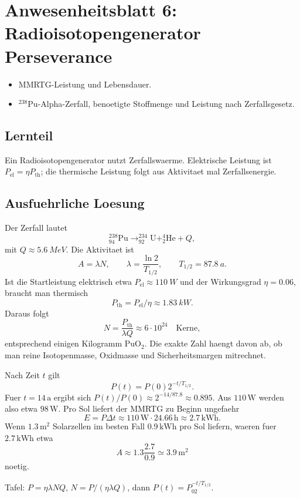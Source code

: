 \documentclass[11pt,a4paper]{scrartcl}
\newcommand{\nuclide}[3]{^{#1}_{#2}\mathrm{#3}}
\begin{document}
\section{Anwesenheitsblatt 6: Radioisotopengenerator Perseverance}
\begin{taskbox}\begin{itemize}\item MMRTG-Leistung und Lebensdauer.\item \(^{238}\mathrm{Pu}\)-Alpha-Zerfall, benoetigte Stoffmenge und Leistung nach Zerfallsgesetz.\end{itemize}\end{taskbox}
\subsection{Lernteil}\begin{learningbox}Ein Radioisotopengenerator nutzt Zerfallswaerme. Elektrische Leistung ist \(P_{\mathrm{el}}=\eta P_{\mathrm{th}}\); die thermische Leistung folgt aus Aktivitaet mal Zerfallsenergie.\end{learningbox}
\subsection{Ausfuehrliche Loesung}
\begin{calculationbox}[title={Zerfall und Leistung}]
Der Zerfall lautet
\[\nuclide{238}{94}{Pu}\to\nuclide{234}{92}{U}+\nuclide{4}{2}{He}+Q,\]
mit \(Q\approx\SI{5.6}{MeV}\). Die Aktivitaet ist
\[A=\lambda N,\qquad \lambda=\frac{\ln2}{T_{1/2}},\qquad T_{1/2}=\SI{87.8}{a}.\]
Ist die Startleistung elektrisch etwa \(P_{\mathrm{el}}\approx\SI{110}{W}\) und der Wirkungsgrad \(\eta=0.06\), braucht man thermisch
\[P_{\mathrm{th}}=P_{\mathrm{el}}/\eta\approx\SI{1.83}{kW}.\]
Daraus folgt
\[N=\frac{P_{\mathrm{th}}}{\lambda Q}\approx6\cdot10^{24}\quad\text{Kerne},\]
entsprechend einigen Kilogramm \(\mathrm{PuO_2}\). Die exakte Zahl haengt davon ab, ob man reine Isotopenmasse, Oxidmasse und Sicherheitsmargen mitrechnet.
\end{calculationbox}
\begin{calculationbox}[title={Leistung nach operational lifetime und Solarvergleich}]
Nach Zeit \(t\) gilt
\[P(t)=P(0)2^{-t/T_{1/2}}.\]
Fuer \(t=14\,\mathrm a\) ergibt sich \(P(t)/P(0)\approx2^{-14/87.8}\approx0.895\). Aus \(110\,\mathrm W\) werden also etwa \(98\,\mathrm W\). Pro Sol liefert der MMRTG zu Beginn ungefaehr
\[E=P\Delta t\approx110\,\mathrm W\cdot24.66\,\mathrm h\approx2.7\,\mathrm{kWh}.\]
Wenn \(1.3\,\mathrm{m^2}\) Solarzellen im besten Fall \(0.9\,\mathrm{kWh}\) pro Sol liefern, waeren fuer \(2.7\,\mathrm{kWh}\) etwa
\[A\approx1.3\frac{2.7}{0.9}\simeq3.9\,\mathrm{m^2}\]
noetig.
\end{calculationbox}
\begin{talkbox}Tafel: \(P=\eta\lambda NQ\), \(N=P/(\eta\lambda Q)\), dann \(P(t)=P_02^{-t/T_{1/2}}\).\end{talkbox}
\end{document}
